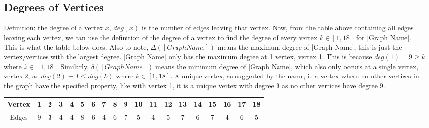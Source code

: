 \documentclass{article}
\begin{document}
\subsection{Degrees of Vertices}
Definition: the degree of a vertex $x$, $deg(x)$ is the number of edges leaving that vertex.
\flushleft
Now, from the table above containing all edges leaving each vertex, we can use the definition of the degree of a vertex to find the degree of every vertex $k \in [1,18]$ for [Graph Name]. This is what the table below does.
\flushleft
Also to note, $\Delta ([Graph Name])$ means the maximum degree of [Graph Name], this is just the vertex/vertices with the largest degree. [Graph Name] only has the maximum degree at 1 vertex, vertex 1. This is because $deg(1) = 9 \geq k$ where $k \in [1,18]$
\flushleft
Similarly, $\delta ([Graph Name])$ means the minimum degree of [Graph Name], which also only occurs at a single vertex, vertex 2, as $deg(2) = 3 \leq deg(k)$ where $k \in [1,18]$.
\flushleft
A unique vertex, as suggested by the name, is a vertex where no other vertices in the graph have the specified property, like with vertex 1, it is a unique vertex with degree 9 as no other vertices have degree 9.

\begin{table}[h!]
  \begin{center}
    \begin{tabular}{|c||c|c|c|c|c|c|c|c|c|c|c|c|c|c|c|c|c|c|}
    \hline
      Vertex & 1&2&3&4&5&6&7&8&9&10&11&12&13&14&15&16&17&18 \\
      \hline
      Edges & 9&3&4&4&8&6&4&6&7&5&4&5&7&6&7&4&6&5 \\
      \hline
    \end{tabular}
  \end{center}
\label{tab:degrees of vertices horizontal}
\end{table}
\end{document}
